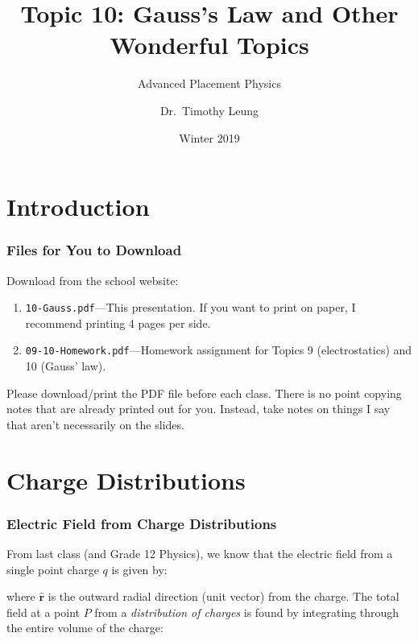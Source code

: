 \documentclass[12pt,aspectratio=169]{beamer}
\title{Topic 10: Gauss's Law and Other Wonderful Topics}
\subtitle{Advanced Placement Physics}
\author[TML]{Dr.\ Timothy Leung}
\institute{Olympiads School}
\date{Winter 2019}
\newcommand{\mb}[1]{\mathbf{#1}}
\newcommand{\eq}[2]{\vspace{#1}{\Large\begin{displaymath}#2\end{displaymath}}}
\begin{document}
\begin{frame}
  \maketitle
\end{frame}


\section[Intro]{Introduction}

\begin{frame}
  \frametitle{Files for You to Download}
  Download from the school website:
  \begin{enumerate}
  \item\texttt{10-Gauss.pdf}---This presentation. If you want to print on
    paper, I recommend printing 4 pages per side.
  \item\texttt{09-10-Homework.pdf}---Homework assignment for Topics 9
    (electrostatics) and 10 (Gauss' law).
  \end{enumerate}

  \vspace{.2in}Please download/print the PDF file before each class. There is
  no point copying notes that are already printed out for you. Instead, take
  notes on things I say that aren't necessarily on the slides.
\end{frame}



\section{Charge Distributions}

\begin{frame}
  \frametitle{Electric Field from Charge Distributions}

  From last class (and Grade 12 Physics), we know that the electric field from a
  single point charge $q$ is given by:

  \eq{-.2in}{\mb{E}=\frac{kq}{r^2}\hat{\mb{r}}}
  
  where $\hat{\mb{r}}$ is the outward radial direction (unit vector) from the
  charge. The total field at a point $P$ from a \emph{distribution of charges}
  is found by integrating through the entire volume of the charge:

  \eq{-.2in}{\boxed{\mb{E}=\int_V\frac{kdq}{r^2}\hat{\mb{r}}}}
\end{frame}
\end{document}
